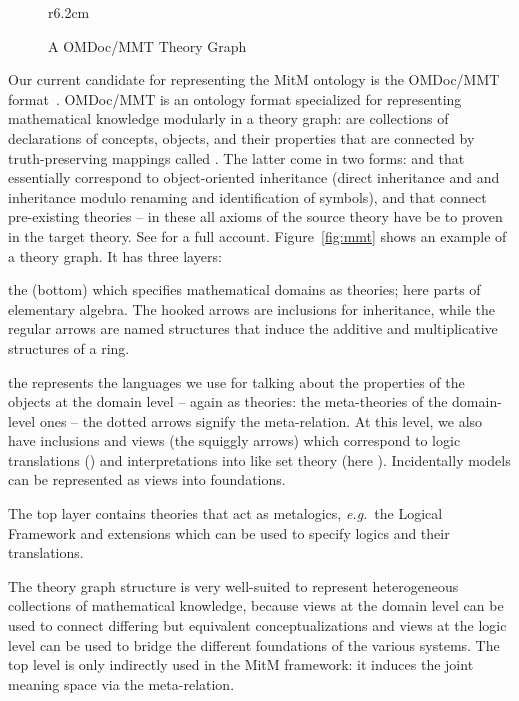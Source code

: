 \begin{wrapfigure}r{6.2cm}\centering\vspace*{-2em}
  \vspace*{-.5em}
  \caption{A OMDoc/MMT Theory Graph}\label{fig:mmt}\vspace*{-1em}
  \label{figure.omdoc.example}
\end{wrapfigure}
Our current candidate for representing the MitM ontology is the OMDoc/MMT
format~\cite{Kohlhase:OMDoc1.2,MMTSVN:on}. OMDoc/MMT is an ontology format specialized for
representing mathematical knowledge modularly in a theory graph:  are
collections of declarations of concepts, objects, and their properties that are connected
by truth-preserving mappings called . The latter come in two
forms:  and  that essentially correspond to
object-oriented inheritance (direct inheritance and and inheritance modulo renaming and
identification of symbols), and  that connect pre-existing theories -- in
these all axioms of the source theory have be to proven in the target theory. See
\cite{RabKoh:WSMSML13} for a full account. Figure~\ref{fig:mmt} shows an example of a
theory graph. It has three layers:
\begin{compactenum}[\em i\rm)]
\item the (bottom)  which specifies mathematical domains as theories; here
  parts of elementary algebra. The hooked arrows are inclusions for inheritance, while the
  regular arrows are named structures that induce the additive and multiplicative
  structures of a ring.
\item the  represents the languages we use for talking about the
  properties of the objects at the domain level -- again as theories: the meta-theories of
  the domain-level ones -- the dotted arrows signify the meta-relation. At this level, we
  also have inclusions and views (the squiggly arrows) which correspond to logic
  translations () and interpretations into  like
  set theory (here ). Incidentally models can be represented as views into
  foundations.
\item The top layer contains theories that act as metalogics, \emph{e.g.}\ the Logical
  Framework  and extensions which can be used to specify logics and their
  translations.
\end{compactenum}
The theory graph structure is very well-suited to represent heterogeneous collections of
mathematical knowledge, because views at the domain level can be used to connect differing
but equivalent conceptualizations and views at the logic level can be used to bridge the
different foundations of the various systems. The top level is only indirectly used in
the MitM framework: it induces the joint meaning space via the meta-relation.

